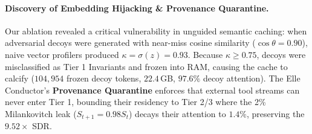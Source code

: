 \documentclass[11pt,letterpaper]{article}
\theoremstyle{definition}
\begin{document}
\begin{table}[h]
\centering
\small
{}
\caption{Ablation comparison showing needle attention mass vs. decoy mass ($d$) and final Signal-to-Distractor Ratio (SDR).}
\label{tab:ablation_results}
\end{table}

\paragraph{Discovery of Embedding Hijacking \& Provenance Quarantine.}
Our ablation revealed a critical vulnerability in unguided semantic caching: when adversarial decoys were generated with near-miss cosine similarity ($\cos \theta = 0.90$), naive vector profilers produced $\kappa = \sigma(z) = 0.93$. Because $\kappa \ge 0.75$, decoys were misclassified as Tier 1 Invariants and frozen into RAM, causing the cache to calcify ($104,954$ frozen decoy tokens, $22.4$\,GB, $97.6\%$ decoy attention). The Elle Conductor's \textbf{Provenance Quarantine} enforces that external tool streams can never enter Tier 1, bounding their residency to Tier 2/3 where the 2\% Milankovitch leak ($S_{t+1} = 0.98 S_t$) decays their attention to $1.4\%$, preserving the $9.52\times$ SDR.
\end{document}
